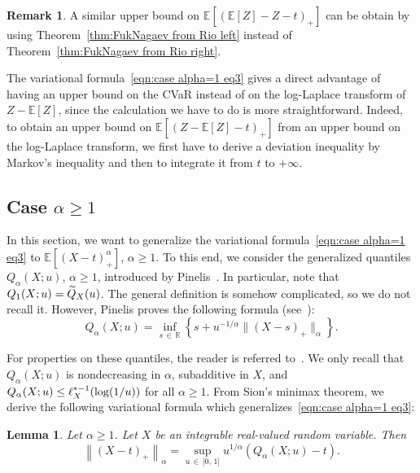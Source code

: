 \documentclass[10pt]{amsart}
\newtheorem{lemm}[theo]{Lemma}\newtheorem{prop}[theo]{Proposition}\newtheorem{coro}[theo]{Corollary}\newtheorem{conj}[theo]{Conjecture}
\theoremstyle{definition}\newtheorem{defi}[theo]{Definition}\newtheorem{rema}[theo]{Remark}\newtheorem{exam}[theo]{Example}\newtheorem{exem}[theo]{Example}\newtheorem{nota}[theo]{Notation}
\newcommand{\bE}{\mathbb{E}}
\newcommand{\bR}{\mathbb{R}}
\let\oldtilde\tilde
\renewcommand*{\tilde}[1]{\mathchoice{\widetilde{#1}}{\widetilde{#1}}{\oldtilde{#1}}{\oldtilde{#1}}}
\begin{document}
\begin{rema}
A similar upper bound on $\bE[(\bE[Z]-Z-t)_+]$ can be obtain by using Theorem~\ref{thm:FukNagaev from Rio left} instead of Theorem~\ref{thm:FukNagaev from Rio right}.
\end{rema}

The variational formula~\eqref{eqn:case alpha=1 eq3} gives a direct advantage of having an upper bound on the CVaR instead of on the log-Laplace transform of $Z-\bE[Z]$, since the calculation we have to do is more straightforward. Indeed, to obtain an upper bound on $\bE[(Z-\bE[Z]-t)_+]$ from an upper bound on the log-Laplace transform, we first have to derive a deviation inequality by Markov's inequality and then to integrate it from $t$ to $+\infty$.

\subsection{Case \texorpdfstring{$\alpha\geq1$}{}} In this section, we want to generalize the variational formula~\eqref{eqn:case alpha=1 eq3} to $\bE[(X-t)_+^\alpha]$, $\alpha\geq 1$. To this end, we consider the generalized quantiles $Q_\alpha(X;u)$, $\alpha\geq 1$, introduced by Pinelis~\cite[Section~3]{Pinelis14b}. In particular, note that $Q_1(X;u)=\tilde Q_X(u)$. The general definition is somehow complicated, so we do not recall it. However, Pinelis proves the following formula (see~\cite[Theorem~3.3]{Pinelis14b}):
\begin{equation}\label{eqn:def generalized quantiles}
Q_\alpha(X;u)=\inf_{s\,\in\,\bR}\left\{s+u^{-1/\alpha}\|(X-s)_+\|_\alpha\right\}.
\end{equation}


For properties on these quantiles, the reader is referred to~\cite[Theorem~3.4]{Pinelis14b}. We only recall that $Q_\alpha(X;u)$ is nondecreasing in $\alpha$, subadditive in $X$, and $Q_\alpha(X;u)\linebreak\leq \ell^{*-1}_X(\log(1/u))$ for all $\alpha\geq 1$. From Sion's minimax theorem, we derive the following variational formula which generalizes~\eqref{eqn:case alpha=1 eq3}:

\begin{lemm}\label{lem:variational formula generalized moments}
Let $\alpha\geq 1$. Let $X$ be an integrable real-valued random variable. Then
\[
\left\|(X-t)_+\right\|_\alpha= \sup_{u\,\in\,]0,\,1]}u^{1/\alpha}\left(Q_\alpha(X;u)-t\right).
\]
\end{lemm}
\end{document}
